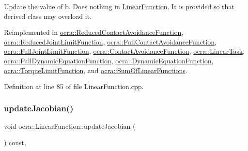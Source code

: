 Update the value of b. Does nothing in \hyperlink{classocra_1_1LinearFunction}{Linear\+Function}. It is provided so that derived class may overload it. 

Reimplemented in \hyperlink{classocra_1_1ReducedContactAvoidanceFunction_ac39227a19a650de28f4ae603511bfb73}{ocra\+::\+Reduced\+Contact\+Avoidance\+Function}, \hyperlink{classocra_1_1ReducedJointLimitFunction_aaf30e3ac7c3053707a04a147b545126c}{ocra\+::\+Reduced\+Joint\+Limit\+Function}, \hyperlink{classocra_1_1FullContactAvoidanceFunction_ae24690ecd464eefd43936907e33c4cb9}{ocra\+::\+Full\+Contact\+Avoidance\+Function}, \hyperlink{classocra_1_1FullJointLimitFunction_a3c9bcab2026535cc5f2c0176552d449d}{ocra\+::\+Full\+Joint\+Limit\+Function}, \hyperlink{classocra_1_1ContactAvoidanceFunction_aed2f145f17ff9fd8dd646018376ea7e9}{ocra\+::\+Contact\+Avoidance\+Function}, \hyperlink{classocra_1_1LinearTask_a83fc0c9f16a8338d3e66db91fef2a319}{ocra\+::\+Linear\+Task}, \hyperlink{group__constraint_gafab74164b55cd66d2b132915774b59f0}{ocra\+::\+Full\+Dynamic\+Equation\+Function}, \hyperlink{classocra_1_1DynamicEquationFunction_ae1fe835a481f5f0bde6c8b0fa8ea09b2}{ocra\+::\+Dynamic\+Equation\+Function}, \hyperlink{classocra_1_1TorqueLimitFunction_a157cb13ffdc53d3a7ed568b59154b0d0}{ocra\+::\+Torque\+Limit\+Function}, and \hyperlink{classocra_1_1SumOfLinearFunctions_ad28c3b6f03dbe68080c06c0d9e4abffa}{ocra\+::\+Sum\+Of\+Linear\+Functions}.



Definition at line 85 of file Linear\+Function.\+cpp.

\hypertarget{classocra_1_1LinearFunction_a30926f977c0124a0b0f65b854ab39636}{}\label{classocra_1_1LinearFunction_a30926f977c0124a0b0f65b854ab39636} 
\subsubsection{\texorpdfstring{update\+Jacobian()}{updateJacobian()}}
{\footnotesize\ttfamily void ocra\+::\+Linear\+Function\+::update\+Jacobian (\begin{DoxyParamCaption}{ }\end{DoxyParamCaption}) const\hspace{0.3cm}{\ttfamily [protected]}, {\ttfamily [virtual]}}



